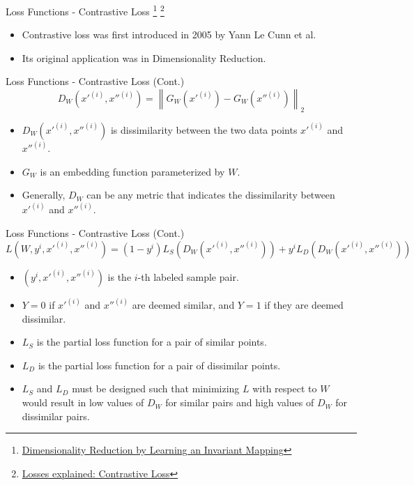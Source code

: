 \documentclass[serif, aspectratio=169]{beamer}
\begin{document}
\begin{frame}{Loss Functions - Contrastive Loss
 \footnote{\href{http://yann.lecun.com/exdb/publis/pdf/hadsell-chopra-lecun-06.pdf}{Dimensionality Reduction by Learning an Invariant Mapping}}
 \footnote{\href{https://medium.com/@maksym.bekuzarov/losses-explained-contrastive-loss-f8f57fe32246}{Losses explained: Contrastive Loss}}
}
     \begin{itemize}
         \item Contrastive loss was first introduced in 2005 by Yann Le Cunn et al.
         \item Its original application was in Dimensionality Reduction.
     \end{itemize}
\end{frame}


\begin{frame}{Loss Functions - Contrastive Loss (Cont.)}
\begin{equation*}
D_W\left(x'^{\left(i\right)}, x''^{\left(i\right)}\right)=\left\|G_W\left(x'^{\left(i\right)}\right)-G_W\left(x''^{\left(i\right)}\right)\right\|_2
\end{equation*}

    \begin{itemize}
        \item $D_W\left(x'^{\left(i\right)}, x''^{\left(i\right)}\right)$ is dissimilarity between the two data points $x'^{\left(i\right)}$ and $x''^{\left(i\right)}$.
        \item $G_W$ is an embedding function parameterized by $W$.
        \item Generally, $D_W$ can be any metric that indicates the dissimilarity between $x'^{\left(i\right)}$ and $x''^{\left(i\right)}$.
    \end{itemize}
\end{frame}


\begin{frame}{Loss Functions - Contrastive Loss (Cont.)}
\begin{equation*}
L\left(W, y^i, x'^{\left(i\right)}, x''^{\left(i\right)}\right)=(1-y^i)
L_S\left(D_W(x'^{\left(i\right)}, x''^{\left(i\right)})\right)+y^i L_D\left(D_W(x'^{\left(i\right)}, x''^{\left(i\right)})\right)
\end{equation*}

    \begin{itemize}
        \item $\left(y^i, x'^{\left(i\right)}, x''^{\left(i\right)}\right)$ is the $i$-th labeled sample pair.
        \item $Y=0$ if $x'^{\left(i\right)}$ and $x''^{\left(i\right)}$ are deemed similar, and $Y=1$ if they are deemed dissimilar.
        \item $L_S$ is the partial loss function for a pair of similar points.
        \item $L_D$ is the partial loss function for a pair of dissimilar points.
        \item $L_S$ and $L_D$ must be designed such that minimizing $L$ with respect to $W$ would result in low values of $D_W$ for similar pairs and high values of $D_W$ for dissimilar pairs.
    \end{itemize}
\end{frame}
\end{document}
